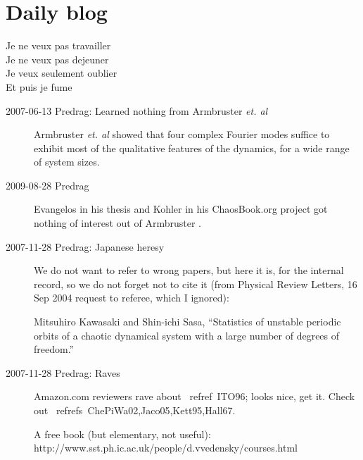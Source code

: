 
\chapter{Daily blog}
\label{c-DailyBlog}

\begin{bartlett}{
Je ne veux pas travailler\\
Je ne veux pas dejeuner\\
Je veux seulement oublier\\
Et puis je fume
            }
\end{bartlett}



\begin{description}

\item[2007-06-13 Predrag: Learned nothing from Armbruster {\em et. al}]
Armbruster {\em et. al} showed that four complex Fourier
modes suffice to exhibit most
of the qualitative features of the dynamics,
for a wide range of system sizes.

\item[2009-08-28 Predrag] Evangelos in his thesis and
Kohler in his
     {ChaosBook.org project}
got nothing of interest out of Armbruster \etal{}.

\item[2007-11-28 Predrag: Japanese heresy]
We do not want to refer to wrong papers, but here it is, for
the internal record, so we do not forget not to cite it
(from Physical Review Letters, 16 Sep 2004 request to referee,
which I ignored):

Mitsuhiro Kawasaki and Shin-ichi Sasa,
    ``Statistics of unstable periodic orbits of a chaotic dynamical system
    with a large number of degrees of freedom.''

\item[2007-11-28 Predrag: Raves]
Amazon.com reviewers rave about ~refref~{ITO96};
looks nice, get it.
Check out
~refrefs~{ChePiWa02,Jaco05,Kett95,Hall67}.

A free book (but elementary, not useful):
\\
http://www.sst.ph.ic.ac.uk/people/d.vvedensky/courses.html

\end{description}

